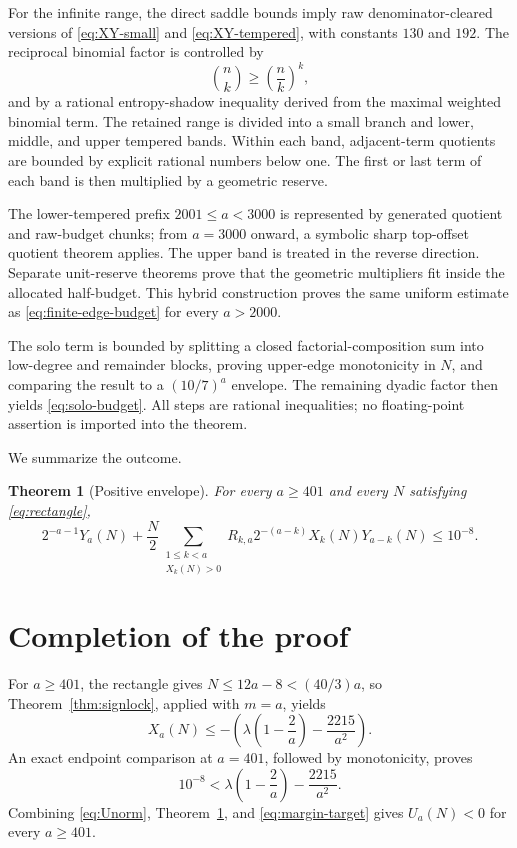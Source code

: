 \documentclass[11pt]{article}
\newtheorem{theorem}{Theorem}[section]
\theoremstyle{definition}
\theoremstyle{remark}
\begin{document}
For the infinite range, the direct saddle bounds imply raw denominator-cleared
versions of \eqref{eq:XY-small} and \eqref{eq:XY-tempered}, with constants
$130$ and $192$.  The reciprocal binomial factor is controlled by
\begin{equation}\label{eq:choose-power}
  \binom nk\ge\left(\frac nk\right)^k,
\end{equation}
and by a rational entropy-shadow inequality derived from the maximal weighted
binomial term.  The retained range is divided into a small branch and lower,
middle, and upper tempered bands.  Within each band, adjacent-term quotients
are bounded by explicit rational numbers below one.  The first or last term
of each band is then multiplied by a geometric reserve.

The lower-tempered prefix $2001\le a<3000$ is represented by generated
quotient and raw-budget chunks; from $a=3000$ onward, a symbolic sharp
top-offset quotient theorem applies.  The upper band is treated in the
reverse direction.  Separate unit-reserve theorems prove that the geometric
multipliers fit inside the allocated half-budget.  This hybrid construction
proves the same uniform estimate as \eqref{eq:finite-edge-budget} for every
$a>2000$.

The solo term is bounded by splitting a closed factorial-composition sum into
low-degree and remainder blocks, proving upper-edge monotonicity in $N$, and
comparing the result to a $(10/7)^a$ envelope.  The remaining dyadic factor
then yields \eqref{eq:solo-budget}.  All steps are rational inequalities; no
floating-point assertion is imported into the theorem.

We summarize the outcome.

\begin{theorem}[Positive envelope]\label{thm:positive-envelope}
For every $a\ge401$ and every $N$ satisfying \eqref{eq:rectangle},
\begin{equation}\label{eq:envelope-result}
  2^{-a-1}Y_a(N)+\frac N2
   \sum_{\substack{1\le k<a\\X_k(N)>0}}
    R_{k,a}2^{-(a-k)}X_k(N)Y_{a-k}(N)
  \le10^{-8}.
\end{equation}
\end{theorem}

\section{Completion of the proof}\label{sec:completion}

For $a\ge401$, the rectangle gives $N\le12a-8<(40/3)a$, so
Theorem~\ref{thm:signlock}, applied with $m=a$, yields
\begin{equation}\label{eq:Xa-margin}
 X_a(N)\le-
 \left(\lambda\left(1-\frac2a\right)-\frac{2215}{a^2}\right).
\end{equation}
An exact endpoint comparison at $a=401$, followed by monotonicity, proves
\begin{equation}\label{eq:margin-target}
  10^{-8}<\lambda\left(1-\frac2a\right)-\frac{2215}{a^2}.
\end{equation}
Combining \eqref{eq:Unorm}, Theorem~\ref{thm:positive-envelope}, and
\eqref{eq:margin-target} gives $U_a(N)<0$ for every $a\ge401$.
\end{document}
